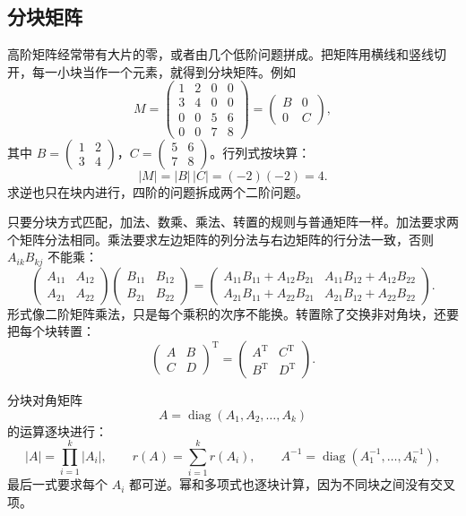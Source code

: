 \subsection{分块矩阵}

高阶矩阵经常带有大片的零，或者由几个低阶问题拼成。把矩阵用横线和竖线切开，每一小块当作一个元素，就得到分块矩阵。例如
\[
M=\left(\begin{array}{cc|cc}
1&2&0&0\\
3&4&0&0\\ \hline
0&0&5&6\\
0&0&7&8
\end{array}\right)
=\begin{pmatrix}B&0\\0&C\end{pmatrix},
\]
其中 \(B=\begin{pmatrix}1&2\\3&4\end{pmatrix}\)，\(C=\begin{pmatrix}5&6\\7&8\end{pmatrix}\)。行列式按块算：
\[
|M|=|B|\,|C|=(-2)(-2)=4.
\]
求逆也只在块内进行，四阶的问题拆成两个二阶问题。

只要分块方式匹配，加法、数乘、乘法、转置的规则与普通矩阵一样。加法要求两个矩阵分法相同。乘法要求左边矩阵的列分法与右边矩阵的行分法一致，否则 \(A_{ik}B_{kj}\) 不能乘：
\[
\begin{pmatrix}A_{11}&A_{12}\\A_{21}&A_{22}\end{pmatrix}
\begin{pmatrix}B_{11}&B_{12}\\B_{21}&B_{22}\end{pmatrix}
=
\begin{pmatrix}
A_{11}B_{11}+A_{12}B_{21}&A_{11}B_{12}+A_{12}B_{22}\\
A_{21}B_{11}+A_{22}B_{21}&A_{21}B_{12}+A_{22}B_{22}
\end{pmatrix}.
\]
形式像二阶矩阵乘法，只是每个乘积的次序不能换。转置除了交换非对角块，还要把每个块转置：
\[
\begin{pmatrix}A&B\\C&D\end{pmatrix}^{\mathrm T}
=\begin{pmatrix}A^{\mathrm T}&C^{\mathrm T}\\B^{\mathrm T}&D^{\mathrm T}\end{pmatrix}.
\]

分块对角矩阵
\[
A=\operatorname{diag}(A_1,A_2,\dots,A_k)
\]
的运算逐块进行：
\[
|A|=\prod_{i=1}^{k}|A_i|,\qquad
r(A)=\sum_{i=1}^{k}r(A_i),\qquad
A^{-1}=\operatorname{diag}(A_1^{-1},\dots,A_k^{-1}),
\]
最后一式要求每个 \(A_i\) 都可逆。幂和多项式也逐块计算，因为不同块之间没有交叉项。

